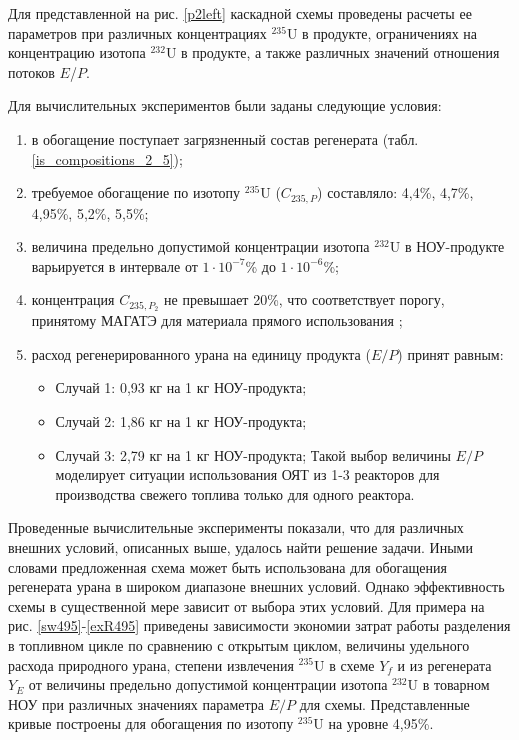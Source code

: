 Для представленной на рис. \ref{p2left} каскадной схемы проведены расчеты ее параметров при различных концентрациях $^{235}$U в продукте, ограничениях на концентрацию изотопа $^{232}$U в продукте, а также различных значений отношения потоков $E$/$P$.

Для вычислительных экспериментов были заданы следующие условия:

\begin{enumerate}
    \item в обогащение поступает загрязненный состав регенерата (табл. \ref{is_compositions_2_5}); 
    \item требуемое обогащение по изотопу $^{235}$U ($C_{235,P}$) составляло: 4,4\%, 4,7\%, 4,95\%, 5,2\%, 5,5\%;    
    \item величина предельно допустимой концентрации изотопа $^{232}$U в НОУ-продукте варьируется в интервале от $1\cdot10^{-7}$\% до $1\cdot10^{-6}$\%;
    \item концентрация $C_{235,{P_2}}$ не превышает 20\%, что соответствует порогу, принятому МАГАТЭ для материала прямого использования \cite{alekseevConceptUseRecycled2010};
    \item расход регенерированного урана на единицу продукта ($E/P$) принят равным:
    \begin{itemize}
        \item Случай 1: 0,93 кг на 1 кг НОУ-продукта;
        \item Случай 2: 1,86 кг на 1 кг НОУ-продукта;
        \item Случай 3: 2,79 кг на 1 кг НОУ-продукта;        
        Такой выбор величины $E/P$ моделирует ситуации использования ОЯТ из 1-3 реакторов для производства свежего топлива только для одного реактора.
    \end{itemize}
\end{enumerate}

Проведенные вычислительные эксперименты показали, что для различных внешних условий, описанных выше, удалось найти решение задачи. Иными словами предложенная схема может быть использована для обогащения регенерата урана в широком диапазоне внешних условий. Однако эффективность схемы в существенной мере зависит от выбора этих условий. Для примера на рис. \ref{sw495}-\ref{exR495} приведены зависимости экономии затрат работы разделения в топливном цикле по сравнению с открытым циклом, величины удельного расхода природного урана, степени извлечения $^{235}$U в схеме $Y_f$ и из регенерата $Y_{E}$ от величины предельно допустимой концентрации изотопа $^{232}$U в товарном НОУ при различных значениях параметра $E/P$ для схемы. Представленные кривые построены для обогащения по изотопу $^{235}$U на уровне 4,95\%.

